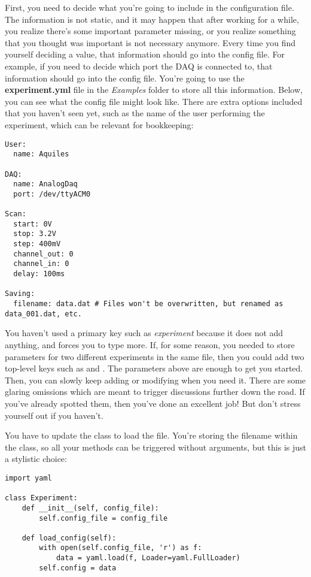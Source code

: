 First, you need to decide what you're going to include in the configuration file. The information is not static, and it may happen that after working for a while, you realize there's some important parameter missing, or you realize something that you thought was important is not necessary anymore. Every time you find yourself deciding a value, that information should go into the config file. For example, if you need to decide which port the DAQ is connected to, that information should go into the config file. You're going to use the \textbf{experiment.yml} file in the \emph{Examples} folder to store all this information. Below, you can see what the config file might look like. There are extra options included that you haven't seen yet, such as the name of the user performing the experiment, which can be relevant for bookkeeping:

\begin{verbatim}
User:
  name: Aquiles

DAQ:
  name: AnalogDaq
  port: /dev/ttyACM0

Scan:
  start: 0V
  stop: 3.2V
  step: 400mV
  channel_out: 0
  channel_in: 0
  delay: 100ms

Saving:
  filename: data.dat # Files won't be overwritten, but renamed as data_001.dat, etc.
\end{verbatim}

You haven't used a primary key such as \emph{experiment} because it does not add anything, and forces you to type more. If, for some reason, you needed to store parameters for two different experiments in the same file, then you could add two top-level keys such as  and . The parameters above are enough to get you started. Then, you can slowly keep adding or modifying when you need it. There are some glaring omissions which are meant to trigger discussions further down the road. If you've already spotted them, then you've done an excellent job! But don't stress yourself out if you haven't.

You have to update the  class to load the file. You're storing the filename within the class, so all your methods can be triggered without arguments, but this is just a stylistic choice:

\begin{verbatim}
import yaml

class Experiment:
    def __init__(self, config_file):
        self.config_file = config_file

    def load_config(self):
        with open(self.config_file, 'r') as f:
            data = yaml.load(f, Loader=yaml.FullLoader)
        self.config = data
\end{verbatim}

